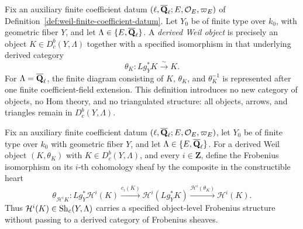\begin{definition}
\label{def:derived-weil-object}


Fix an auxiliary finite coefficient datum
\((\ell,\overline{\mathbf Q}_\ell;E,\mathcal O_E,\varpi_E)\) of
Definition~\ref{def:weil-finite-coefficient-datum}.  Let \(Y_0\) be of
finite type over \(k_0\), with geometric fiber \(Y\), and
let \(\Lambda\in\{E,\overline{\mathbf Q}_\ell\}\).  A
\emph{derived Weil object} is precisely an object
\(K\in D^b_c(Y,\Lambda)\) together with a specified isomorphism in that
underlying derived category
\[
 \theta_K:Lg_Y^*K\xrightarrow{\sim}K.
\]
For \(\Lambda=\overline{\mathbf Q}_\ell\), the finite diagram consisting of \(K\), \(\theta_K\),
and \(\theta_K^{-1}\) is represented after one finite coefficient-field
extension.  This definition introduces no new category of objects, no Hom
theory, and no triangulated structure: all objects, arrows, and triangles
remain in \(D^b_c(Y,\Lambda)\).
\end{definition}


\begin{definition}
\label{def:cohomology-weil-structure}


Fix an auxiliary finite coefficient datum
\((\ell,\overline{\mathbf Q}_\ell;E,\mathcal O_E,\varpi_E)\), let \(Y_0\) be of finite type
over \(k_0\) with geometric fiber \(Y\), and let
\(\Lambda\in\{E,\overline{\mathbf Q}_\ell\}\).  For a derived Weil object
\((K,\theta_K)\) with \(K\in D^b_c(Y,\Lambda)\), and every
\(i\in\mathbf Z\),
define the Frobenius isomorphism
on its \(i\)-th cohomology sheaf by the composite in the constructible heart
\[
 \theta_{\mathcal H^iK}:
 Lg_Y^*\mathcal H^i(K)
 \xrightarrow{c_i(K)}\mathcal H^i(Lg_Y^*K)
 \xrightarrow{\mathcal H^i(\theta_K)}\mathcal H^i(K).
\]
Thus \(\mathcal H^i(K)\in\operatorname{Sh}_c(Y,\Lambda)\) carries a specified
object-level Frobenius structure without passing to a derived category of
Frobenius sheaves.
\end{definition}

